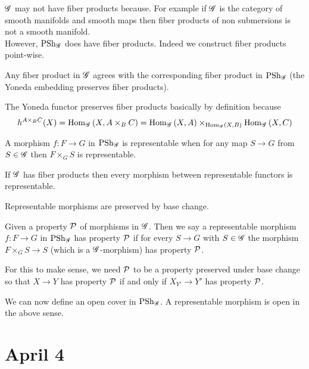\documentclass[12pt]{article}
\begin{document}
$\mathscr{G}$ may not have fiber products because. For example if $\mathscr{G}$ is the category of smooth manifolds and smooth maps then fiber products of non submersions is not a smooth manifold.
\bigskip\\
However, $\mathrm{PSh}_{\mathscr{G}}$ does have fiber products. Indeed we construct fiber products point-wise. 

\begin{exercise}
Any fiber product in $\mathscr{G}$ agrees with the corresponding fiber product in $\mathrm{PSh}_{\mathscr{G}}$ (the Yoneda embedding preserves fiber products). 
\end{exercise}

The Yoneda functor preserves fiber products basically by definition because 
\[ h^{A \times_B C}(X) = \mathrm{Hom}_{\mathscr{G}} \left( X, A \times_B C \right) = \mathrm{Hom}_{\mathscr{G}} \left( X, A \right) \times_{\mathrm{Hom}_{\mathscr{G}} \left( X, B \right)} \mathrm{Hom}_{\mathscr{G}} \left( X, C \right) \]

\begin{defn}
A morphism $f : F \to G$ in $\mathrm{PSh}_{\mathscr{G}}$ is representable when for any map $S \to G$ from $S \in \mathscr{G}$ then $F \times_G S$ is representable. 
\end{defn}

\begin{rmk}
If $\mathscr{G}$ has fiber products then every morphism between representable functors is representable.
\end{rmk}

\begin{exercise}
Representable morphisms are preserved by base change.
\end{exercise}

\begin{defn}
Given a property $\mathcal{P}$ of morphisms in $\mathscr{G}$. Then we say a representable morphism $f : F \to G$ in $\mathrm{PSh}_{\mathscr{G}}$ has property $\mathcal{P}$ if for every $S \to G$ with $S \in \mathscr{G}$ the morphism $F \times_G S \to S$ (which is a $\mathscr{G}$-morphism) has property $\mathcal{P}$.
\end{defn}

\begin{rmk}
For this to make sense, we need $\mathcal{P}$ to be a property preserved under base change so that $X \to Y$ has property $\mathcal{P}$ if and only if $X_{Y'} \to Y'$ has property $\mathcal{P}$. 
\end{rmk}

\begin{defn}
We can now define an open cover in $\mathrm{PSh}_{\mathscr{G}}$. A representable morphism is open in the above sense. 
\end{defn}

\section{April 4}
\end{document}
